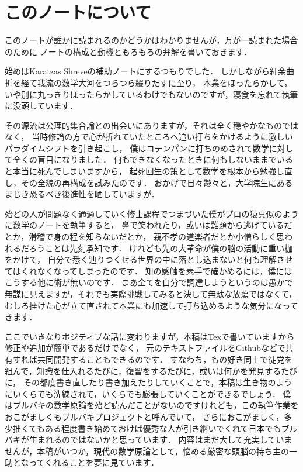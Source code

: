\chapter*{このノートについて}

このノートが誰かに読まれるのかどうかはわかりませんが，万が一読まれた場合のために
ノートの構成と動機ともろもろの弁解を書いておきます．

始めはKaratzas Shreveの補助ノートにするつもりでした．
しかしながら紆余曲折を経て我流の数学大河をつらつら綴りだすに至り，
本業をほったらかして，いや別に丸っきりほったらかしているわけでもないのですが，寝食を忘れて執筆に没頭しています．

その源流は公理的集合論との出会いにありますが，それは全く穏やかなものではなく，
当時修論の方で心が折れていたところへ追い打ちをかけるように激しいパラダイムシフトを引き起こし，
僕はコテンパンに打ちのめされて数学に対して全くの盲目になりました．
何もできなくなったときに何もしないままでいると本当に死んでしまいますから，
起死回生の策として数学を根本から勉強し直し，その全貌の再構成を試みたのです．
おかげで日々鬱々と，大学院生にあるまじき恐るべき後進性を晒していますが．

殆どの人が問題なく通過していく修士課程でつまづいた僕がプロの猿真似のように数学のノートを執筆すると，
鼻で笑われたり，或いは難題から逃げているだとか，滑稽で身の程を知らないだとか，
親不孝の道楽者だとか小憎らしく思われるだろうことは先刻承知です．
けれども先の大革命が僕の脳の活動に重い枷をかけて，
自分で悉く辿りつくせる世界の中に落とし込まないと何も理解させてはくれなくなってしまったのです．
知の感触を素手で確かめるには，僕にはこうする他に術が無いのです．
まあ全てを自分で調達しようというのは愚かで無謀に見えますが，それでも実際挑戦してみると決して無駄な放蕩ではなくて，
むしろ挫けた心が立て直されて本業にも加速して打ち込めるような気分になってきます．

ここでいきなりポジティブな話に変わりますが，本稿はTexで書いていますから修正や追加が簡単であるだけでなく，
元のテキストファイルをGithubなどで共有すれば共同開発することもできるのです．
すなわち，もの好き同士で徒党を組んで，知識を仕入れるたびに，復習をするたびに，或いは何かを発見するたびに，
その都度書き直したり書き加えたりしていくことで，本稿は生き物のようにいくらでも洗練されて，いくらでも膨張していくことができるでしょう．
僕はブルバキの数学原論を殆ど読んだことがないのですけれども，この執筆作業をおこがましくもブルバキプロジェクトと呼んでいて，
さらにおこがましく，多少拙くてもある程度書き始めておけば優秀な人が引き継いでくれて日本でもブルバキが生まれるのではないかと思っています．
内容はまだ大して充実していませんが，本稿がいつか，現代の数学原論として，悩める厳密な頭脳の持ち主の一助となってくれることを夢に見ています．

